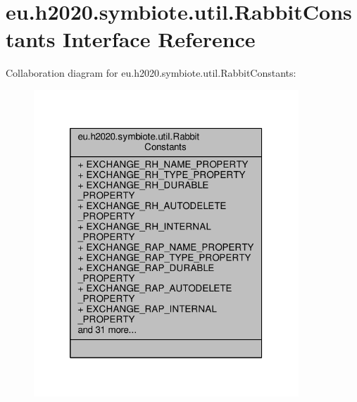 \hypertarget{interfaceeu_1_1h2020_1_1symbiote_1_1util_1_1RabbitConstants}{}\section{eu.\+h2020.\+symbiote.\+util.\+Rabbit\+Constants Interface Reference}
\label{interfaceeu_1_1h2020_1_1symbiote_1_1util_1_1RabbitConstants}


Collaboration diagram for eu.\+h2020.\+symbiote.\+util.\+Rabbit\+Constants\+:
\nopagebreak
\begin{figure}[H]
\begin{center}
\leavevmode
\includegraphics[width=282pt]{interfaceeu_1_1h2020_1_1symbiote_1_1util_1_1RabbitConstants__coll__graph}
\end{center}
\end{figure}

